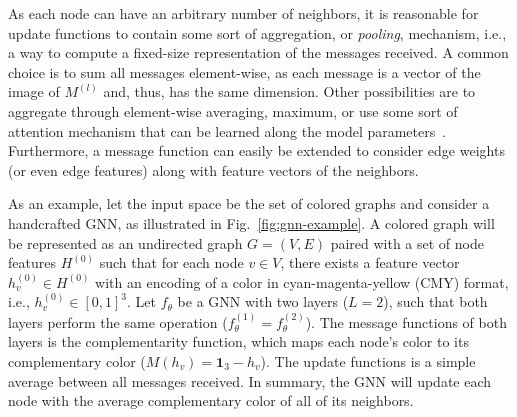 As each node can have an arbitrary number of neighbors, it is reasonable for update functions to contain some sort of aggregation, or \emph{pooling}, mechanism, i.e., a way to compute a fixed-size representation of the messages received.
A common choice is to sum all messages element-wise, as each message is a vector of the image of $M^{(l)}$ and, thus, has the same dimension.
Other possibilities are to aggregate through element-wise averaging, maximum, or use some sort of attention mechanism that can be learned along the model parameters~\cite{velickovic2018graph}.
Furthermore, a message function can easily be extended to consider edge weights (or even edge features) along with feature vectors of the neighbors.

As an example, let the input space be the set of colored graphs and consider a handcrafted GNN, as illustrated in Fig.~\ref{fig:gnn-example}.
A colored graph will be represented as an undirected graph $G=(V,E)$ paired with a set of node features $H^{(0)}$ such that for each node $v\in V$, there exists a feature vector $h_v^{(0)}\in H^{(0)}$ with an encoding of a color in cyan-magenta-yellow (CMY) format, i.e., $h_v^{(0)}\in [0,1]^3$.
Let $f_\theta$ be a GNN with two layers ($L=2$), such that both layers perform the same operation ($f_\theta^{(1)}=f_\theta^{(2)}$).
The message functions of both layers is the complementarity function, which maps each node's color to its complementary color ($M(h_v) = \bm{1}_3 - h_v$).  
The update functions is a simple average between all messages received.
In summary, the GNN will update each node with the average complementary color of all of its neighbors.

